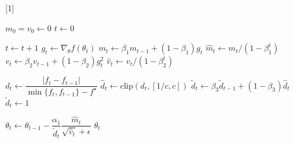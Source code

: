 \documentclass[preview,varwidth,border=5mm]{standalone}
\begin{document}
\algnewcommand{\Default}[1]{ }
\newcommand{\wh}[1]{\widehat{#1}}
\newcommand{\wt}[1]{\widetilde{#1}}

\begin{algorithmic}[1]

\Statex

\State $m_0 = v_0 \gets 0$
\State $t \gets 0$
\Statex

  \State $t \gets t + 1$
  \State $g_t \gets \nabla_\theta f(\theta_t)$
  \State $m_t \gets \beta_1 m_{t-1} + (1 - \beta_1)g_t$
  \State $\wh{m}_t \gets m_t / (1 - \beta_1^t)$
  \State $v_t \gets \beta_2 v_{t-1} + (1 - \beta_2)g_t^2$
  \State $\wh{v}_t \gets v_t / (1 - \beta_2^t)$
  \Statex

    \State $d_t \gets \dfrac{|f_t - f_{t-1}|}{\min\{f_t, f_{t-1}\} - f^\star}$
    \State $\wh{d}_t \gets \text{clip}(d_t, [1 / c, c])$
    \State $\wt{d}_t \gets \beta_3 \wt{d}_{t-1} + (1 - \beta_3)\wh{d}_t$
  \Else
    \State $\wt{d}_t \gets 1$
  \EndIf
  \Statex

  \State $\theta_t \gets \theta_{t-1}
                         - \dfrac{\alpha_1}{\wt{d}_t}
                           \dfrac{\wh{m}_t}{\sqrt{\wh{v}_t} + \epsilon}$
\EndWhile
\State \Return $\theta_t$

\end{algorithmic}
\end{document}
